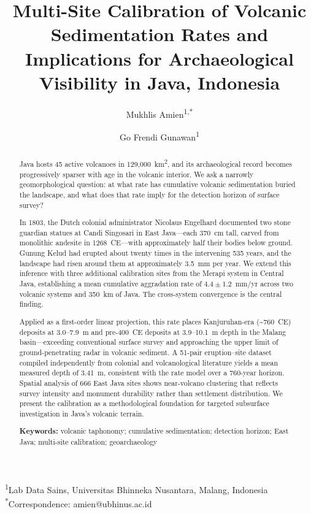 \documentclass[12pt,a4paper]{article}
\begin{document}
\title{Multi-Site Calibration of Volcanic Sedimentation Rates and Implications for Archaeological Visibility in Java, Indonesia}

\author{Mukhlis Amien\textsuperscript{1,*} \and Go Frendi Gunawan\textsuperscript{1}}

\date{}

\maketitle

\noindent\textsuperscript{1}Lab Data Sains, Universitas Bhinneka Nusantara, Malang, Indonesia\\
\textsuperscript{*}Correspondence: amien@ubhinus.ac.id

\begin{abstract}
Java hosts 45 active volcanoes in 129,000~km\textsuperscript{2}, and its archaeological record becomes progressively sparser with age in the volcanic interior. We ask a narrowly geomorphological question: at what rate has cumulative volcanic sedimentation buried the landscape, and what does that rate imply for the detection horizon of surface survey?

In 1803, the Dutch colonial administrator Nicolaus Engelhard documented two stone guardian statues at Candi Singosari in East Java---each 370~cm tall, carved from monolithic andesite in 1268~CE---with approximately half their bodies below ground. Gunung Kelud had erupted about twenty times in the intervening 535 years, and the landscape had risen around them at approximately 3.5~mm per year. We extend this inference with three additional calibration sites from the Merapi system in Central Java, establishing a mean cumulative aggradation rate of $4.4 \pm 1.2$~mm/yr across two volcanic systems and 350~km of Java. The cross-system convergence is the central finding.

Applied as a first-order linear projection, this rate places Kanjuruhan-era (\textasciitilde760~CE) deposits at 3.0--7.9~m and pre-400~CE deposits at 3.9--10.1~m depth in the Malang basin---exceeding conventional surface survey and approaching the upper limit of ground-penetrating radar in volcanic sediment. A 51-pair eruption--site dataset compiled independently from colonial and volcanological literature yields a mean measured depth of 3.41~m, consistent with the rate model over a 760-year horizon. Spatial analysis of 666 East Java sites shows near-volcano clustering that reflects survey intensity and monument durability rather than settlement distribution. We present the calibration as a methodological foundation for targeted subsurface investigation in Java's volcanic terrain.

\medskip
\noindent\textbf{Keywords:} volcanic taphonomy; cumulative sedimentation; detection horizon; East Java; multi-site calibration; geoarchaeology
\end{abstract}
\end{document}

